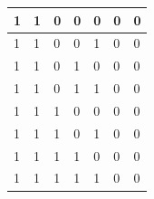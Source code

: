 \documentclass[a4paper,14pt]{article}
\begin{document}
\begin{table}[H]
\begin{center}
\begin{tabular}{|l|l|l|l|l|l|l|}
		1  & 1  & 0  & 0  & 0 & 0  & 0  \\ \hline
		1  & 1  & 0  & 0  & 1 & 0  & 0  \\ \hline
		1  & 1  & 0  & 1  & 0 & 0  & 0  \\ \hline
		1  & 1  & 0  & 1  & 1 & 0  & 0  \\ \hline
		1  & 1  & 1  & 0  & 0 & 0  & 0  \\ \hline
		1  & 1  & 1  & 0  & 1 & 0  & 0  \\ \hline
		1  & 1  & 1  & 1  & 0 & 0  & 0  \\ \hline
		1  & 1  & 1  & 1  & 1 & 0  & 0  \\ \hline
	\end{tabular}
\end{center}
\end{table}
\end{document}
